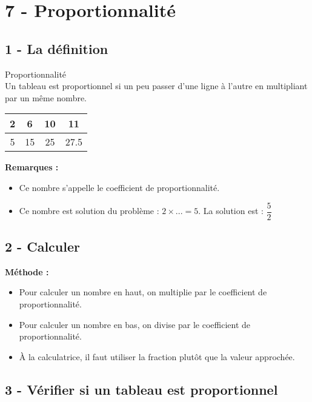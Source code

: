



\section*{7 - Proportionnalité}

\subsection*{1 - La définition}

\begin{Definition}{Proportionnalité}\\
  Un tableau est proportionnel si un peu passer d'une ligne à l'autre en multipliant par un même nombre.
\end{Definition}

\begin{center} \begin{tabular}{|c|c|c|c|} \hline
  2 &  6 & 10 & 11   \\ \hline
  5 & 15 & 25 & 27.5 \\ \hline 
 \end{tabular}\end{center}

\textbf{Remarques : }
\begin{itemize}[label={$\bullet$}]
  \item Ce nombre s'appelle le coefficient de proportionnalité.
  \item Ce nombre est solution du problème : $2 \times ... = 5$. La solution est : $\dfrac{5}{2}$
\end{itemize}  

\subsection*{2 - Calculer}

\textbf{Méthode : }
\begin{itemize}[label={$\bullet$}]
  \item Pour calculer un nombre en haut, on multiplie par le coefficient de proportionnalité. 
  \item Pour calculer un nombre en bas, on divise par le coefficient de proportionnalité. 
  \item À la calculatrice, il faut utiliser la fraction plutôt que la valeur approchée. 
\end{itemize}  


\subsection*{3 - Vérifier si un tableau est proportionnel}

